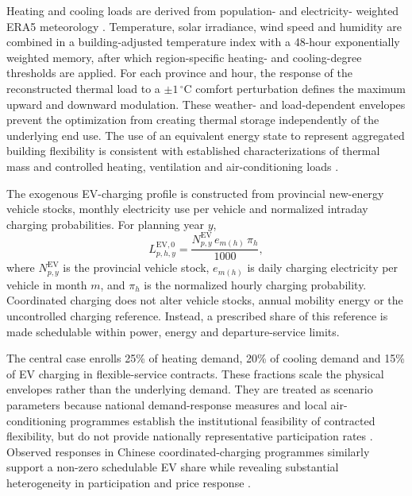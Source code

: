 \documentclass[12pt]{article}
\begin{document}
Heating and cooling loads are derived from population- and electricity-
weighted ERA5 meteorology \cite{Hersbach2020ERA5}. Temperature, solar
irradiance, wind speed and humidity are combined in a building-adjusted
temperature index with a 48-hour exponentially weighted memory, after which
region-specific heating- and cooling-degree thresholds are applied. For each
province and hour, the response of the reconstructed thermal load to a
$\pm1\,^{\circ}\mathrm{C}$ comfort perturbation defines the maximum upward
and downward modulation. These weather- and load-dependent envelopes prevent
the optimization from creating thermal storage independently of the
underlying end use. The use of an equivalent energy state to represent
aggregated building flexibility is consistent with established
characterizations of thermal mass and controlled heating, ventilation and
air-conditioning loads
\cite{IEAEBC67,Stinner2016,Klein2017,HuangWu2019,Chen2023Cooling}.

The exogenous EV-charging profile is constructed from provincial new-energy
vehicle stocks, monthly electricity use per vehicle and normalized intraday
charging probabilities. For planning year $y$,
\begin{equation}
  L^{\mathrm{EV},0}_{p,h,y}
  =
  \frac{
    N^{\mathrm{EV}}_{p,y}\,
    e_{m(h)}\,
    \pi_h
  }{1000},
  \label{eq:evbaseline}
\end{equation}
where $N^{\mathrm{EV}}_{p,y}$ is the provincial vehicle stock,
$e_{m(h)}$ is daily charging electricity per vehicle in month $m$, and
$\pi_h$ is the normalized hourly charging probability. Coordinated charging
does not alter vehicle stocks, annual mobility energy or the uncontrolled
charging reference. Instead, a prescribed share of this reference is made
schedulable within power, energy and departure-service limits.

The central case enrolls 25\% of heating demand, 20\% of cooling demand and
15\% of EV charging in flexible-service contracts. These fractions scale the
physical envelopes rather than the underlying demand. They are treated as
scenario parameters because national demand-response measures and local
air-conditioning programmes establish the institutional feasibility of
contracted flexibility, but do not provide nationally representative
participation rates
\cite{NDRCDemand2023,ShanghaiHVAC2025,AnhuiDR2025,ZhejiangHVAC2025}.
Observed responses in Chinese coordinated-charging programmes similarly
support a non-zero schedulable EV share while revealing substantial
heterogeneity in participation and price response
\cite{Liu2021OrderlyCharging,Zhao2026Charging}.
\end{document}
